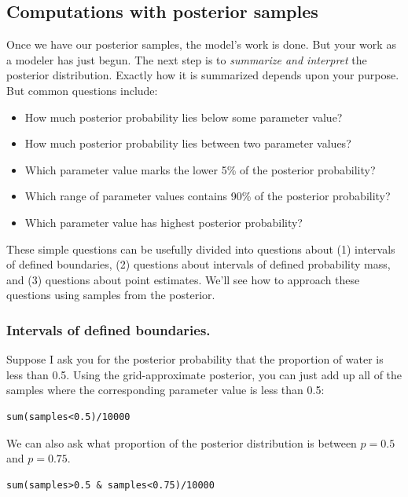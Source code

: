 \documentclass[11pt]{article}
\begin{document}
\subsection*{Computations with posterior samples}
\label{sec-6-3}

Once we have our posterior samples, the model's work is done.  But your work as a modeler has just begun.  The next step is to \emph{summarize and interpret} the posterior distribution. Exactly how it is summarized depends upon your purpose. But common questions include:

\begin{itemize}
\item How much posterior probability lies below some parameter value?
\item How much posterior probability lies between two parameter values?
\item Which parameter value marks the lower 5\% of the posterior probability?
\item Which range of parameter values contains 90\% of the posterior probability?
\item Which parameter value has highest posterior probability?
\end{itemize}

These simple questions can be usefully divided into questions about (1) intervals of defined boundaries, (2) questions about intervals of defined probability mass, and (3) questions about point estimates. We'll see how to approach these questions using samples from the posterior.

\subsubsection*{Intervals of defined boundaries.}
\label{sec-6-3-1}

Suppose I ask you for the posterior probability that the proportion of water is less than 0.5. Using the grid-approximate posterior, you can just add up all of the samples where the corresponding parameter value is less than 0.5:

\begin{verbatim}
sum(samples<0.5)/10000
\end{verbatim}

We can also ask what proportion of the posterior distribution is between $p=0.5$ and $p=0.75$.

\begin{verbatim}
sum(samples>0.5 & samples<0.75)/10000
\end{verbatim}
\end{document}

